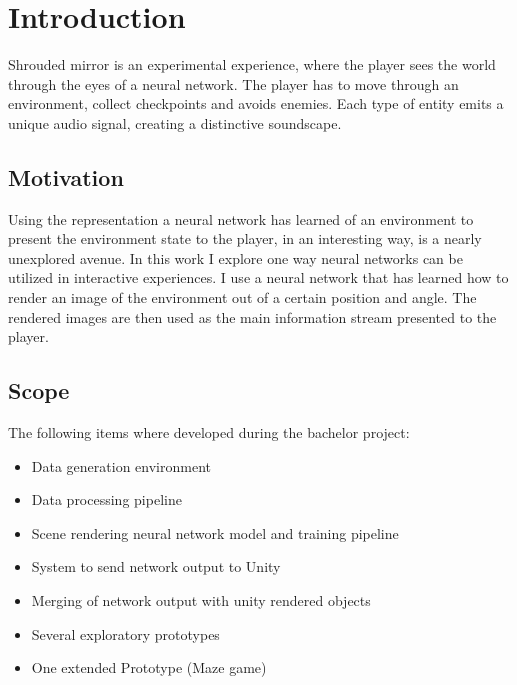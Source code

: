 
\chapter{Introduction}
Shrouded mirror is an experimental experience, where the player sees the world through the eyes of a neural network. The player has to move through an environment, collect checkpoints and avoids enemies. Each type of entity emits a unique audio signal, creating a distinctive soundscape.

\section{Motivation}
Using the representation a neural network has learned of an environment to present the environment state to the player, in an interesting way, is a nearly unexplored avenue. In this work I explore one way neural networks can be utilized in interactive experiences. I use a neural network that has learned how to  render an image of the environment out of a certain position and angle. The rendered images are then used as the main information stream presented to the player.

\section{Scope}
The following items where developed during the bachelor project:

\begin{itemize}
\item{Data generation environment}
\item{Data processing pipeline}
\item{Scene rendering neural network model and training pipeline}
\item{System to send network output to Unity}
\item{Merging of network output with unity rendered objects}
\item{Several exploratory prototypes}
\item{One extended Prototype (Maze game)}
\end{itemize}
